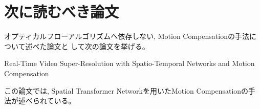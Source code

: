 \documentclass[dvipdfmx,a4j,10pt, twocolumn]{jsarticle}
\begin{document}
\section*{次に読むべき論文}

オプティカルフローアルゴリズムへ依存しない, Motion Compensationの手法について述べた論文と
して次の論文を挙げる。

Real-Time Video Super-Resolution with Spatio-Temporal Networks and Motion Compensation \cite{8099787}

この論文では, 
Spatial Transformer Networkを用いたMotion Compensationの手法が述べられている。

\printbibliography[title=参考文献] %
\end{document}
